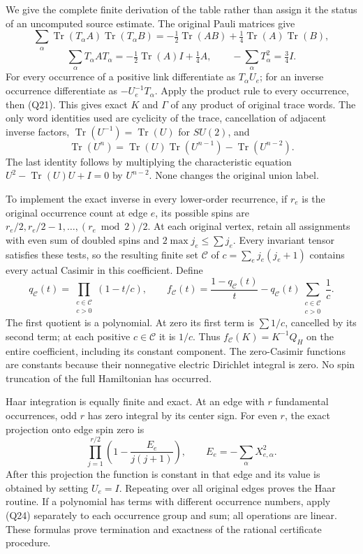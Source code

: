 \documentclass[11pt]{article}
\begin{document}
We give the complete finite derivation of the table rather than assign it the status of an uncomputed source estimate. The original Pauli matrices give
\[
 \sum_\alpha\operatorname{Tr}(T_\alpha A)\operatorname{Tr}(T_\alpha B)
 =-\tfrac12\operatorname{Tr}(AB)+\tfrac14\operatorname{Tr}(A)\operatorname{Tr}(B),
\]
\[
 \sum_\alpha T_\alpha A T_\alpha=-\tfrac12\operatorname{Tr}(A)I+\tfrac14A,
 \qquad-\sum_\alpha T_\alpha^2=\tfrac34I .
 \tag{Q21}
\]
For every occurrence of a positive link differentiate as \(T_\alpha U_e\); for an inverse occurrence differentiate as \(-U_e^{-1}T_\alpha\). Apply the product rule to every occurrence, then (Q21). This gives exact \(K\) and \(\Gamma\) of any product of original trace words. The only word identities used are cyclicity of the trace, cancellation of adjacent inverse factors, \(\operatorname{Tr}(U^{-1})=\operatorname{Tr}(U)\) for \(SU(2)\), and
\[
 \operatorname{Tr}(U^n)=\operatorname{Tr}(U)\operatorname{Tr}(U^{n-1})
                         -\operatorname{Tr}(U^{n-2}).
 \tag{Q22}
\]
The last identity follows by multiplying the characteristic equation \(U^2-\operatorname{Tr}(U)U+I=0\) by \(U^{n-2}\). None changes the original union label.

To implement the exact inverse in every lower-order recurrence, if \(r_e\) is the original occurrence count at edge \(e\), its possible spins are \(r_e/2,r_e/2-1,\ldots,(r_e\bmod2)/2\). At each original vertex, retain all assignments with even sum of doubled spins and \(2\max j_e\le\sum j_e\). Every invariant tensor satisfies these tests, so the resulting finite set \(\mathcal C\) of \(c=\sum_e j_e(j_e+1)\) contains every actual Casimir in this coefficient. Define
\[
 q_{\mathcal C}(t)=\prod_{\substack{c\in\mathcal C\\c>0}}(1-t/c),\qquad
 f_{\mathcal C}(t)=\frac{1-q_{\mathcal C}(t)}t
                  -q_{\mathcal C}(t)\sum_{\substack{c\in\mathcal C\\c>0}}\frac1c .
 \tag{Q23}
\]
The first quotient is a polynomial. At zero its first term is \(\sum1/c\), cancelled by its second term; at each positive \(c\in\mathcal C\) it is \(1/c\). Thus \(f_{\mathcal C}(K)=K^{-1}Q_H\) on the entire coefficient, including its constant component. The zero-Casimir functions are constants because their nonnegative electric Dirichlet integral is zero. No spin truncation of the full Hamiltonian has occurred.

Haar integration is equally finite and exact. At an edge with \(r\) fundamental occurrences, odd \(r\) has zero integral by its center sign. For even \(r\), the exact projection onto edge spin zero is
\[
 \prod_{j=1}^{r/2}\left(1-\frac{E_e}{j(j+1)}\right),
 \qquad E_e=-\sum_\alpha X_{e,\alpha}^2.
 \tag{Q24}
\]
After this projection the function is constant in that edge and its value is obtained by setting \(U_e=I\). Repeating over all original edges proves the Haar routine. If a polynomial has terms with different occurrence numbers, apply (Q24) separately to each occurrence group and sum; all operations are linear. These formulas prove termination and exactness of the rational certificate procedure.
\end{document}
